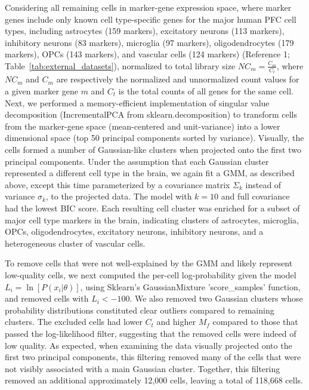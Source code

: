 Considering all remaining cells in marker-gene expression space, where marker genes include only known cell type-specific genes for the major human PFC cell types, including astrocytes (159 markers), excitatory neurons (113 markers), inhibitory neurons (83 markers), microglia (97 markers), oligodendrocytes (179 markers), OPCs (143 markers), and vascular cells (124 markers) (Reference 1; Table~\ref{tab:external_datasets}), normalized to total library size $NC_m = \frac{C_m}{C_t}$, where $NC_m$ and $C_m$ are respectively the normalized and unnormalized count values for a given marker gene $m$ and $C_t$ is the total counts of all genes for the same cell. Next, we performed a memory-efficient implementation of singular value decomposition (IncrementalPCA from sklearn.decomposition) to transform cells from the marker-gene space (mean-centered and unit-variance) into a lower dimensional space (top 50 principal components sorted by variance). Visually, the cells formed a number of Gaussian-like clusters when projected onto the first two principal components. Under the assumption that each Gaussian cluster represented a different cell type in the brain, we again fit a GMM, as described above, except this time parameterized by a covariance matrix $\Sigma_k$ instead of variance $\sigma_k$, to the projected data. The model with $k = 10$ and full covariance had the lowest BIC score. Each resulting cell cluster was enriched for a subset of major cell type markers in the brain, indicating clusters of astrocytes, microglia, OPCs, oligodendrocytes, excitatory neurons, inhibitory neurons, and a heterogeneous cluster of vascular cells.

To remove cells that were not well-explained by the GMM and likely represent low-quality cells, we next computed the per-cell log-probability given the model $L_i = \ln[P(x_i|\theta)]$, using Sklearn's GaussianMixture 'score\_samples' function, and removed cells with $L_i < -100$. We also removed two Gaussian clusters whose probability distributions constituted clear outliers compared to remaining clusters. The excluded cells had lower $C_t$ and higher $M_f$ compared to those that passed the log-likelihood filter, suggesting that the removed cells were indeed of low quality. As expected, when examining the data visually projected onto the first two principal components, this filtering removed many of the cells that were not visibly associated with a main Gaussian cluster. Together, this filtering removed an additional approximately 12,000 cells, leaving a total of 118,668 cells.

